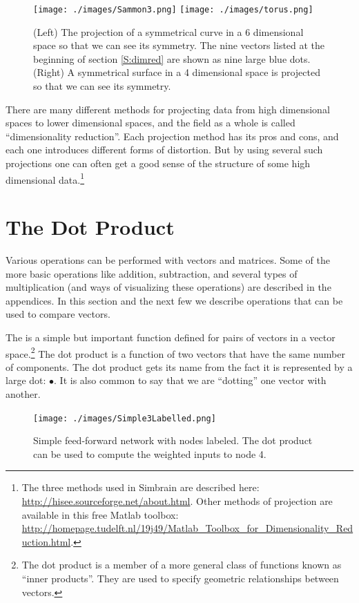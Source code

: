 \begin{figure}[h]
\centering
\texttt{[image: ./images/Sammon3.png]}
\texttt{[image: ./images/torus.png]}
\caption[Scott Hotton.]{(Left) The projection of a symmetrical curve in a 6 dimensional space 
so that we can see its symmetry. The nine vectors listed at the beginning of 
section \ref{S:dimred} are shown as nine large blue dots. (Right) A 
symmetrical surface in a 4 dimensional space is projected so that we can see 
its symmetry.}
\label{F:projection}
\end{figure}

There are many different methods for projecting data from high dimensional spaces to lower dimensional spaces, and the field as a whole is called ``dimensionality reduction''. Each projection method has its pros and cons, and each one introduces different forms of distortion. But by using several such projections one can often get a good sense of the structure of some high dimensional data.\footnote{The three methods used in Simbrain are described here: \url{http://hisee.sourceforge.net/about.html}. Other methods of projection are available in this free Matlab toolbox: \url{http://homepage.tudelft.nl/19j49/Matlab_Toolbox_for_Dimensionality_Reduction.html}.}

\section{The Dot Product}\label{dotProduct}

Various operations can be performed with vectors and matrices. Some of the more basic operations like addition, subtraction, and several types of multiplication (and ways of visualizing these operations) are described in the appendices. In this section and the next few we describe operations that can be used to compare vectors.

   The  is a simple but important function defined for 
pairs of vectors in a vector space.\footnote{The dot product is a member 
of a more general class of functions known as ``inner products''. They are 
used to specify geometric relationships between vectors.}  The dot product is a function of two 
vectors that have the same 
number of components. The dot product gets its name from the fact it is represented by 
a large dot: $\bullet$. It is also common to say that we are ``dotting'' one 
vector with another.
\begin{figure}[h]
\centering
\texttt{[image: ./images/Simple3Labelled.png]}
\caption[Simbrain screenshot.]{Simple feed-forward network with nodes labeled. 
The dot product can be used to compute the weighted inputs to node 4.} 
\label{F:simplelabelled}
\end{figure}

